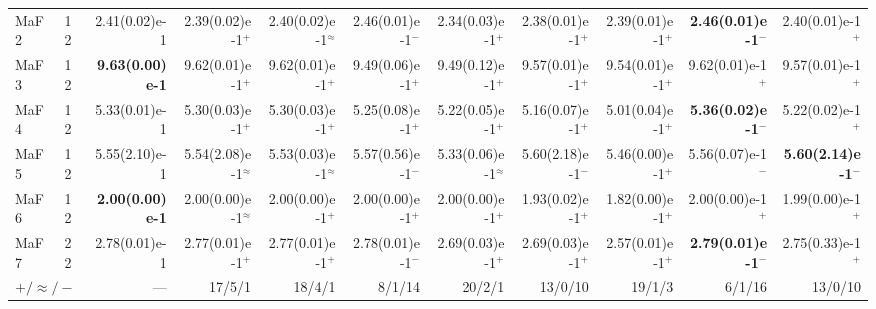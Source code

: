 \begin{longtable}{llrrrrrrrrr}
MaF2 & 12 & 2.41(0.02)e-1 & 2.39(0.02)e-1$^{+}$ & 2.40(0.02)e-1$^{\approx}$ & 2.46(0.01)e-1$^{-}$ & 2.34(0.03)e-1$^{+}$ & 2.38(0.01)e-1$^{+}$ & 2.39(0.01)e-1$^{+}$ & \textbf{2.46(0.01)e-1}$^{-}$ & 2.40(0.01)e-1$^{+}$ \\
MaF3 & 12 & \textbf{9.63(0.00)e-1} & 9.62(0.01)e-1$^{+}$ & 9.62(0.01)e-1$^{+}$ & 9.49(0.06)e-1$^{+}$ & 9.49(0.12)e-1$^{+}$ & 9.57(0.01)e-1$^{+}$ & 9.54(0.01)e-1$^{+}$ & 9.62(0.01)e-1$^{+}$ & 9.57(0.01)e-1$^{+}$ \\
MaF4 & 12 & 5.33(0.01)e-1 & 5.30(0.03)e-1$^{+}$ & 5.30(0.03)e-1$^{+}$ & 5.25(0.08)e-1$^{+}$ & 5.22(0.05)e-1$^{+}$ & 5.16(0.07)e-1$^{+}$ & 5.01(0.04)e-1$^{+}$ & \textbf{5.36(0.02)e-1}$^{-}$ & 5.22(0.02)e-1$^{+}$ \\
MaF5 & 12 & 5.55(2.10)e-1 & 5.54(2.08)e-1$^{\approx}$ & 5.53(0.03)e-1$^{\approx}$ & 5.57(0.56)e-1$^{-}$ & 5.33(0.06)e-1$^{\approx}$ & 5.60(2.18)e-1$^{-}$ & 5.46(0.00)e-1$^{+}$ & 5.56(0.07)e-1$^{-}$ & \textbf{5.60(2.14)e-1}$^{-}$ \\
MaF6 & 12 & \textbf{2.00(0.00)e-1} & 2.00(0.00)e-1$^{\approx}$ & 2.00(0.00)e-1$^{+}$ & 2.00(0.00)e-1$^{+}$ & 2.00(0.00)e-1$^{+}$ & 1.93(0.02)e-1$^{+}$ & 1.82(0.00)e-1$^{+}$ & 2.00(0.00)e-1$^{+}$ & 1.99(0.00)e-1$^{+}$ \\
MaF7 & 22 & 2.78(0.01)e-1 & 2.77(0.01)e-1$^{+}$ & 2.77(0.01)e-1$^{+}$ & 2.78(0.01)e-1$^{-}$ & 2.69(0.03)e-1$^{+}$ & 2.69(0.03)e-1$^{+}$ & 2.57(0.01)e-1$^{+}$ & \textbf{2.79(0.01)e-1}$^{-}$ & 2.75(0.33)e-1$^{+}$ \\
\midrule
\multicolumn{2}{l}{$+/\approx/-$} & --- & 17/5/1 & 18/4/1 & 8/1/14 & 20/2/1 & 13/0/10 & 19/1/3 & 6/1/16 & 13/0/10 \\
\end{longtable}